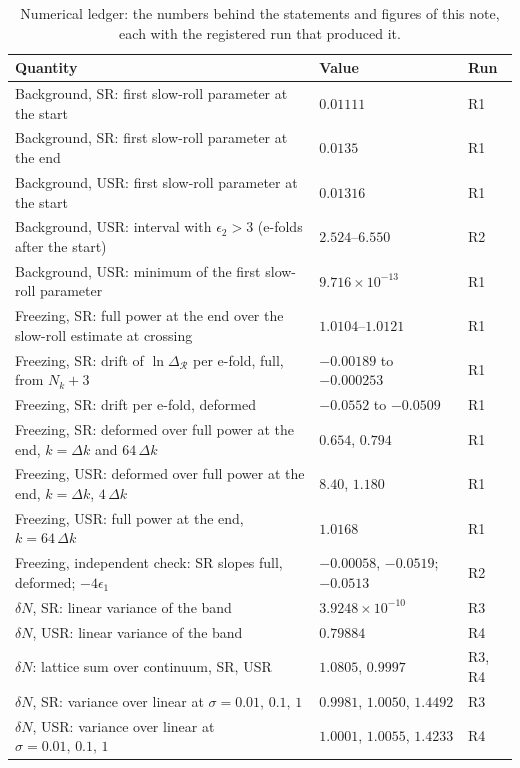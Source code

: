 \begin{table}
\caption{\label{tab:ledger}Numerical ledger: the numbers behind the statements and figures of this note, each with the registered run that produced it.}
\begin{ruledtabular}
\footnotesize
\begin{tabular}{p{}p{}p{}}
Quantity & Value & Run \\
\hline
Background, SR: first slow-roll parameter at the start & $0.01111$ & R1 \\
Background, SR: first slow-roll parameter at the end & $0.0135$ & R1 \\
Background, USR: first slow-roll parameter at the start & $0.01316$ & R1 \\
Background, USR: interval with $\epsilon_2>3$ (e-folds after the start) & $2.524$--$6.550$ & R2 \\
Background, USR: minimum of the first slow-roll parameter & $9.716\times10^{-13}$ & R1 \\
Freezing, SR: full power at the end over the slow-roll estimate at crossing & $1.0104$--$1.0121$ & R1 \\
Freezing, SR: drift of $\ln\Delta_\mathcal{R}$ per e-fold, full, from $N_k+3$ & $-0.00189$ to $-0.000253$ & R1 \\
Freezing, SR: drift per e-fold, deformed & $-0.0552$ to $-0.0509$ & R1 \\
Freezing, SR: deformed over full power at the end, $k=\Delta k$ and $64\,\Delta k$ & $0.654$, $0.794$ & R1 \\
Freezing, USR: deformed over full power at the end, $k=\Delta k$, $4\,\Delta k$ & $8.40$, $1.180$ & R1 \\
Freezing, USR: full power at the end, $k=64\,\Delta k$ & $1.0168$ & R1 \\
Freezing, independent check: SR slopes full, deformed; $-4\epsilon_1$ & $-0.00058$, $-0.0519$; $-0.0513$ & R2 \\
$\delta N$, SR: linear variance of the band & $3.9248\times10^{-10}$ & R3 \\
$\delta N$, USR: linear variance of the band & $0.79884$ & R4 \\
$\delta N$: lattice sum over continuum, SR, USR & $1.0805$, $0.9997$ & R3, R4 \\
$\delta N$, SR: variance over linear at $\sigma=0.01,\,0.1,\,1$ & $0.9981$, $1.0050$, $1.4492$ & R3 \\
$\delta N$, USR: variance over linear at $\sigma=0.01,\,0.1,\,1$ & $1.0001$, $1.0055$, $1.4233$ & R4 \\

\end{tabular}
\end{ruledtabular}
\end{table}
